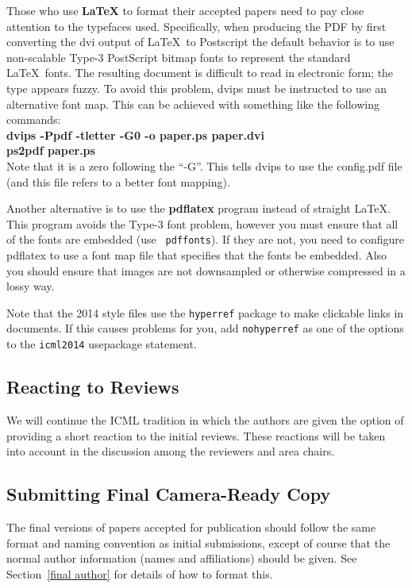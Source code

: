 \documentclass{article}
\begin{document}
Those who use \textbf{\LaTeX} to format their accepted papers need to
pay close attention to the typefaces used.  Specifically, when
producing the PDF by first converting the dvi output of \LaTeX\ to Postscript
the default behavior is to use non-scalable Type-3 PostScript bitmap
fonts to represent the standard \LaTeX\ fonts. The resulting document
is difficult to read in electronic form; the type appears fuzzy. To
avoid this problem, dvips must be instructed to use an alternative
font map.  This can be achieved with
something like the following commands:\\[0.5em]
{\bf dvips -Ppdf -tletter -G0 -o paper.ps paper.dvi}\\
{\bf ps2pdf paper.ps}\\[0.5em]
Note that it is a zero following the ``-G''.  This tells dvips to use
the config.pdf file (and this file refers to a better font mapping).

Another alternative is to use the \textbf{pdflatex} program instead of
straight \LaTeX. This program avoids the Type-3 font problem, however
you must ensure that all of the fonts are embedded (use {\tt
pdffonts}). If they are not, you need to configure pdflatex to use a
font map file that specifies that the fonts be embedded. Also you
should ensure that images are not downsampled or otherwise compressed
in a lossy way.

Note that the 2014 style files use the {\tt hyperref} package to
make clickable links in documents.  If this causes problems for you,
add {\tt nohyperref} as one of the options to the {\tt icml2014}
usepackage statement.

\subsection{Reacting to Reviews}
We will continue the ICML tradition in which the authors are given the
option of providing a short reaction to the initial reviews. These
reactions will be taken into account in the discussion among the
reviewers and area chairs.

\subsection{Submitting Final Camera-Ready Copy}

The final versions of papers accepted for publication should follow the
same format and naming convention as initial submissions, except of
course that the normal author information (names and affiliations)
should be given.  See Section~\ref{final author} for details of how to
format this.
\end{document}
